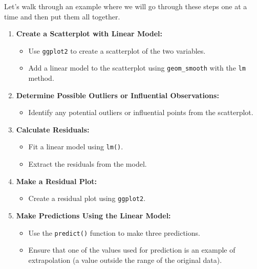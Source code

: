 \documentclass[
  letterpaper,
  DIV=11,
  numbers=noendperiod]{scrreprt}
\providecommand{\tightlist}{%
  \setlength{\itemsep}{0pt}\setlength{\parskip}{0pt}}\usepackage{longtable,booktabs,array}
\begin{document}

Let's walk through an example where we will go through these steps one
at a time and then put them all together.

\begin{enumerate}
\def\labelenumi{\arabic{enumi}.}
\tightlist
\item
  \textbf{Create a Scatterplot with Linear Model:}

  \begin{itemize}
  \tightlist
  \item
    Use \texttt{ggplot2} to create a scatterplot of the two variables.
  \item
    Add a linear model to the scatterplot using \texttt{geom\_smooth}
    with the \texttt{lm} method.
  \end{itemize}
\item
  \textbf{Determine Possible Outliers or Influential Observations:}

  \begin{itemize}
  \tightlist
  \item
    Identify any potential outliers or influential points from the
    scatterplot.
  \end{itemize}
\item
  \textbf{Calculate Residuals:}

  \begin{itemize}
  \tightlist
  \item
    Fit a linear model using \texttt{lm()}.
  \item
    Extract the residuals from the model.
  \end{itemize}
\item
  \textbf{Make a Residual Plot:}

  \begin{itemize}
  \tightlist
  \item
    Create a residual plot using \texttt{ggplot2}.
  \end{itemize}
\item
  \textbf{Make Predictions Using the Linear Model:}

  \begin{itemize}
  \tightlist
  \item
    Use the \texttt{predict()} function to make three predictions.
  \item
    Ensure that one of the values used for prediction is an example of
    extrapolation (a value outside the range of the original data).
  \end{itemize}
\end{enumerate}
\end{document}
